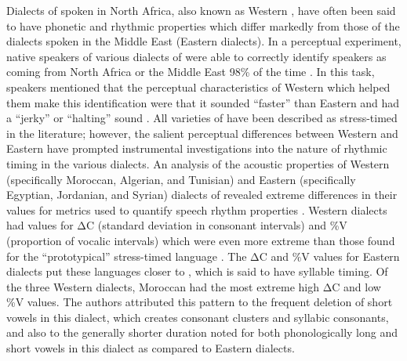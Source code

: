   Dialects of  spoken in North Africa, also known as Western , have often been said to have phonetic and rhythmic properties which differ markedly from those of the dialects spoken in the Middle East (Eastern  dialects). In a perceptual experiment, native speakers of various dialects of  were able to correctly identify  speakers as coming from North Africa or the Middle East 98\% of the time \citep{BarkatEtAl1999}. In this task, speakers mentioned that the perceptual characteristics of Western  which helped them make this identification were that it sounded “faster” than Eastern  and had a “jerky” or “halting” sound \citep{GhazaliEtAl2002}. All varieties of  have been described as stress-timed in the literature; however, the salient perceptual differences between Western and Eastern  have prompted instrumental investigations into the nature of rhythmic timing in the various dialects. An analysis of the acoustic properties of Western (specifically Moroccan, Algerian, and Tunisian) and Eastern (specifically Egyptian, Jordanian, and Syrian) dialects of  revealed extreme differences in their values for metrics used to quantify speech rhythm properties \citep{HamdiEtAl2004}. Western  dialects had values for ΔC (standard deviation in consonant intervals) and \%V (proportion of vocalic intervals) which were even more extreme than those found for the ``prototypical'' stress-timed language . The ΔC and \%V values for Eastern  dialects put these languages closer to , which is said to have syllable timing. Of the three Western  dialects, Moroccan  had the most extreme high ΔC and low \%V values. The authors attributed this pattern to the frequent deletion of short vowels in this dialect, which creates consonant clusters and syllabic consonants, and also to the generally shorter duration noted for both phonologically long and short vowels in this dialect as compared to Eastern  dialects.

